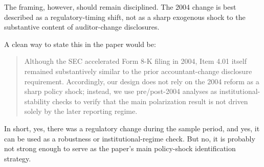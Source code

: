 \documentclass[11pt]{article}
\begin{document}
The framing, however, should remain disciplined. The 2004 change is best described as a regulatory-timing shift, not as a sharp exogenous shock to the substantive content of auditor-change disclosures.

A clean way to state this in the paper would be:

\begin{quote}
Although the SEC accelerated Form 8-K filing in 2004, Item 4.01 itself remained substantively similar to the prior accountant-change disclosure requirement. Accordingly, our design does not rely on the 2004 reform as a sharp policy shock; instead, we use pre/post-2004 analyses as institutional-stability checks to verify that the main polarization result is not driven solely by the later reporting regime.
\end{quote}

In short, yes, there was a regulatory change during the sample period, and yes, it can be used as a robustness or institutional-regime check. But no, it is probably not strong enough to serve as the paper's main policy-shock identification strategy.
\end{document}
